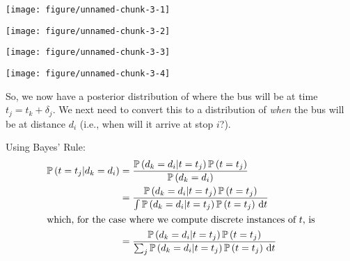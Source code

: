 \documentclass[11pt]{article}\usepackage[]{graphicx}\usepackage[]{color}
\newenvironment{knitrout}{}{} %
\newcommand{\pr}{\mathbb{P}}
\renewcommand{\Pr}[1]{\pr\left(#1\right)}
\begin{document}
\begin{knitrout}
\color{fgcolor}

{\centering \texttt{[image: figure/unnamed-chunk-3-1]} 

}




{\centering \texttt{[image: figure/unnamed-chunk-3-2]} 

}




{\centering \texttt{[image: figure/unnamed-chunk-3-3]} 

}




{\centering \texttt{[image: figure/unnamed-chunk-3-4]} 

}



\end{knitrout}




So, we now have a posterior distribution of where the bus will be at time $t_j = t_k + \delta_j$.
We next need to convert this to a distribution of \emph{when} the bus will be at distance $d_i$
(i.e., when will it arrive at stop $i$?).

Using Bayes' Rule:
\begin{align*}
   \Pr{t = t_j | d_k = d_i}
  &= \frac{\Pr{d_k = d_i | t = t_j} \Pr{t = t_j}}{\Pr{d_k = d_i}} \\
  &= \frac{\Pr{d_k = d_i | t = t_j} \Pr{t = t_j}}{\int\Pr{d_k = d_i | t = t_j} \Pr{t = t_j}\,\mathrm{d}t} \\
  \intertext{which, for the case where we compute discrete instances of $t$, is}
  &= \frac{\Pr{d_k = d_i | t = t_j} \Pr{t = t_j}}{\sum_j\Pr{d_k = d_i | t = t_j} \Pr{t = t_j}\,\mathrm{d}t} \\
\end{align*}
\end{document}
